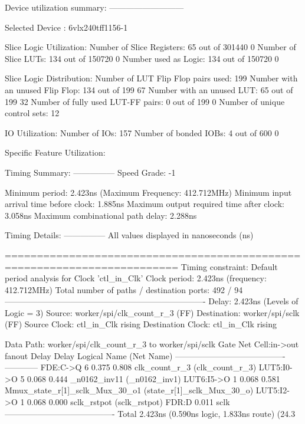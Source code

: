 \documentclass{article}
\begin{document}
Device utilization summary:
---------------------------

Selected Device : 6vlx240tff1156-1 


Slice Logic Utilization: 
 Number of Slice Registers:              65  out of  301440     0%
 Number of Slice LUTs:                  134  out of  150720     0%
    Number used as Logic:               134  out of  150720     0%

Slice Logic Distribution: 
 Number of LUT Flip Flop pairs used:    199
   Number with an unused Flip Flop:     134  out of    199    67%
   Number with an unused LUT:            65  out of    199    32%
   Number of fully used LUT-FF pairs:     0  out of    199     0%
   Number of unique control sets:        12

IO Utilization: 
 Number of IOs:                         157
 Number of bonded IOBs:                   4  out of    600     0%

Specific Feature Utilization:

\fi
\iffalse
Timing Summary:
---------------
Speed Grade: -1

   Minimum period: 2.423ns (Maximum Frequency: 412.712MHz)
   Minimum input arrival time before clock: 1.885ns
   Maximum output required time after clock: 3.058ns
   Maximum combinational path delay: 2.288ns

Timing Details:
---------------
All values displayed in nanoseconds (ns)

=========================================================================
Timing constraint: Default period analysis for Clock 'ctl_in_Clk'
  Clock period: 2.423ns (frequency: 412.712MHz)
  Total number of paths / destination ports: 492 / 94
-------------------------------------------------------------------------
Delay:               2.423ns (Levels of Logic = 3)
  Source:            worker/spi/clk_count_r_3 (FF)
  Destination:       worker/spi/sclk (FF)
  Source Clock:      ctl_in_Clk rising
  Destination Clock: ctl_in_Clk rising

  Data Path: worker/spi/clk_count_r_3 to worker/spi/sclk
                                Gate     Net
    Cell:in->out      fanout   Delay   Delay  Logical Name (Net Name)
    ----------------------------------------  ------------
     FDE:C->Q              6   0.375   0.808  clk_count_r_3 (clk_count_r_3)
     LUT5:I0->O            5   0.068   0.444  _n0162_inv11 (_n0162_inv1)
     LUT6:I5->O            1   0.068   0.581  Mmux_state_r[1]_sclk_Mux_30_o1 (state_r[1]_sclk_Mux_30_o)
     LUT5:I2->O            1   0.068   0.000  sclk_rstpot (sclk_rstpot)
     FDR:D                     0.011          sclk
    ----------------------------------------
    Total                      2.423ns (0.590ns logic, 1.833ns route)
                                       (24.3%
\end{document}
